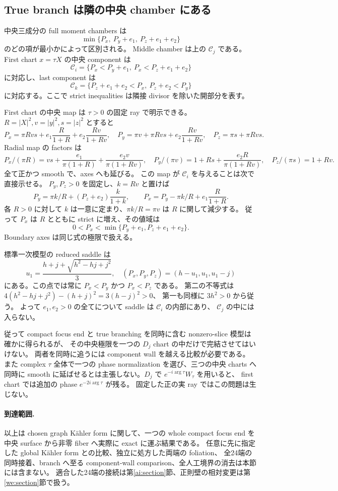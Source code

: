 \subsection{True branch は隣の中央 chamber にある}

中央三成分の full moment chambers は
\[
 \min\{P_x,\ P_y+e_1,\ P_z+e_1+e_2\}
\]
のどの項が最小かによって区別される。
Middle chamber は上の $\mathcal C_j$ である。
First chart $x=\tau X$ の中央 component は
\[
 \mathcal C_i=\{P_x<P_y+e_1,\ P_x<P_z+e_1+e_2\}
\]
に対応し、last component は
\[
 \mathcal C_k=\{P_z+e_1+e_2<P_x,\ P_z+e_2<P_y\}
\]
に対応する。ここで strict inequalities は隣接 divisor を除いた開部分を表す。

First chart の中央 map は $\tau>0$ の固定 ray で明示できる。
$R=|X|^2,v=|y|^2,s=|z|^2$ とすると
\[
 P_x=\pi Rvs+e_1\frac R{1+R}+e_2\frac{Rv}{1+Rv},\quad
 P_y=\pi v+\pi Rvs+e_2\frac{Rv}{1+Rv},\quad
 P_z=\pi s+\pi Rvs.
\]
Radial map の factors は
\[
 P_x/(\pi R)=vs+\frac{e_1}{\pi(1+R)}+\frac{e_2v}{\pi(1+Rv)},\quad
 P_y/(\pi v)=1+Rs+\frac{e_2R}{\pi(1+Rv)},\quad
 P_z/(\pi s)=1+Rv.
\]
全て正かつ smooth で、axes へも延びる。
この map が $\mathcal C_i$ を与えることは次で直接示せる。
$P_y,P_z>0$ を固定し、$k=Rv$ と置けば
\[
 P_y=\pi k/R+(P_z+e_2)\frac{k}{1+k},\qquad
 P_x=P_y-\pi k/R+e_1\frac R{1+R}.
\]
各 $R>0$ に対して $k$ は一意に定まり、$\pi k/R=\pi v$ は $R$ に関して減少する。
従って $P_x$ は $R$ とともに strict に増え、その値域は
\[
 0<P_x<\min\{P_y+e_1,P_z+e_1+e_2\}.
\]
Boundary axes は同じ式の極限で扱える。

標準一次模型の reduced saddle は
\[
 u_1=\frac{h+j+\sqrt{h^2-hj+j^2}}3,
 \quad (P_x,P_y,P_z)=(h-u_1,u_1,u_1-j)
\]
にある。この点では常に $P_x<P_y$ かつ $P_x<P_z$ である。
第二の不等式は
$4(h^2-hj+j^2)-(h+j)^2=3(h-j)^2>0$、
第一も同様に $3h^2>0$ から従う。
よって $e_1,e_2>0$ の全てについて saddle は $\mathcal C_i$ の内部にあり、
$\mathcal C_j$ の中には入らない。

従って compact focus end と true branching を同時に含む nonzero-slice 模型は確かに得られるが、
その中央極限を一つの $D_j$ chart の中だけで完結させてはいけない。
両者を同時に追うには component wall を越える比較が必要である。
また complex $\tau$ 全体で一つの phase normalization を選び、三つの中央 charts へ
同時に smooth に延ばせるとは主張しない。$D_j$ で $e^{-i\arg\tau}W_\tau$ を用いると、
first chart では追加の phase $e^{-2i\arg\tau}$ が残る。
固定した正の実 ray ではこの問題は生じない。

\paragraph{到達範囲.}
以上は chosen graph Kähler form に関して、一つの whole compact focus end を
中央 surface から非零 fiber へ実際に exact に運ぶ結果である。
任意に先に指定した global Kähler form との比較、独立に処方した両端の foliation、
全24端の同時接着、branch へ至る component-wall comparison、全人工境界の消去は本節には含まない。
適合した24端の接続は第\ref{ai:section}節、正則壁の相対変更は第\ref{we:section}節で扱う。

